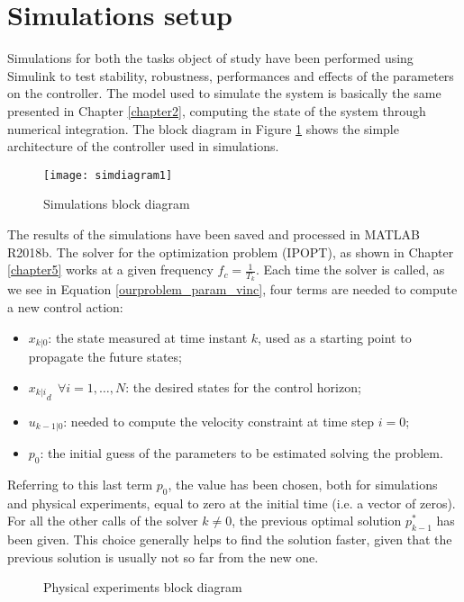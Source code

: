 \section{Simulations setup}

Simulations for both the tasks object of study have been performed using Simulink to test stability, robustness, performances and effects of the parameters on the controller. The model used to simulate the system is basically the same presented in Chapter \ref{chapter2}, computing the state of the system through numerical integration. The block diagram in Figure \ref{simdiagram1} shows the simple architecture of the controller used in simulations.

\begin{figure}[h!]
\texttt{[image: simdiagram1]}
\centering
\caption{Simulations block diagram} 
\label{simdiagram1}
\end{figure}

The results of the simulations have been saved and processed in MATLAB R2018b. The solver for the optimization problem (IPOPT), as shown in Chapter \ref{chapter5} works at a given frequency $f_c=\frac{1}{T_k}$. Each time the solver is called, as we see in Equation \ref{ourproblem_param_vinc}, four terms are needed to compute a new control action: 
\begin{itemize}
\item $x_{k|0}$: the state measured at time instant $k$, used as a starting point to propagate the future states;
\item ${x_{k|i}}_d \ \ \forall i=1,\dots,N$: the desired states for the control horizon;
\item $u_{k-1|0}$: needed to compute the velocity constraint at time step $i=0$;
\item $p_0$: the initial guess of the parameters to be estimated solving the problem.
\end{itemize}
Referring to this last term $p_0$, the value has been chosen, both for simulations and physical experiments, equal to zero at the initial time (i.e. a vector of zeros). For all the other calls of the solver $k\neq0$, the previous optimal solution $p_{k-1}^*$ has been given. This choice generally helps to find the solution faster, given that the previous solution is usually not so far from the new one.
\begin{figure}[h!]
	
	\centering
	
	\caption{Physical experiments block diagram} 
	
	\label{diagramreal}
\end{figure}

